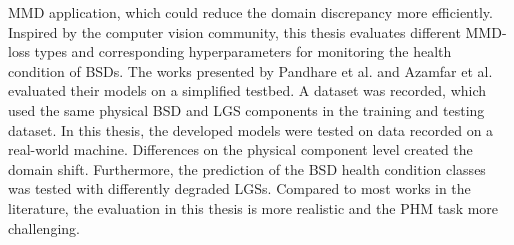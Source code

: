 MMD application, which could reduce the domain discrepancy more efficiently. Inspired by the computer vision community, this thesis evaluates different MMD-loss types and corresponding hyperparameters for monitoring the health condition of BSDs. The works presented by Pandhare et al. \cite{Pandhare2021} and Azamfar et al. \cite{AZAMFAR2020103932} evaluated their models on a simplified testbed. A dataset was recorded, which used the same physical BSD and LGS components in the training and testing dataset. In this thesis, the developed models were tested on data recorded on a real-world machine. Differences on the physical component level created the domain shift. Furthermore, the prediction of the BSD health condition classes was tested with differently degraded LGSs. Compared to most works in the literature, the evaluation in this thesis is more realistic and the PHM task more challenging. 
